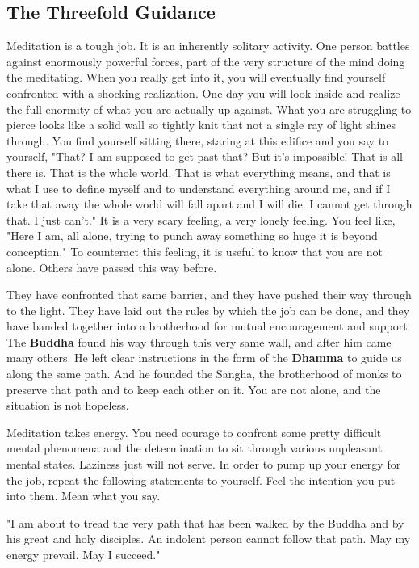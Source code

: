 \subsection*{The Threefold Guidance }
Meditation is a tough job. It is an inherently solitary
activity. One person battles against enormously powerful forces, part of the
very structure of the mind doing the meditating. When you really get into it,
you will eventually find yourself confronted with a shocking realization. One
day you will look inside and realize the full enormity of what you are actually
up against. What you are struggling to pierce looks like a solid wall so tightly
knit that not a single ray of light shines through. You find yourself sitting
there, staring at this edifice and you say to yourself, "That? I am supposed to
get past that? But it's impossible! That is all there is. That is the whole
world. That is what everything means, and that is what I use to define myself
and to understand everything around me, and if I take that away the whole world
will fall apart and I will die. I cannot get through that. I just can't." It is
a very scary feeling, a very lonely feeling. You feel like, "Here I am, all
alone, trying to punch away something so huge it is beyond conception." To
counteract this feeling, it is useful to know that you are not alone. Others
have passed this way before.

They have confronted that same barrier, and they have pushed their way through
to the light. They have laid out the rules by which the job can be done, and
they have banded together into a brotherhood for mutual encouragement and
support. The \textbf{Buddha} found his way through this very same wall, and after him
came many others. He left clear instructions in the form of the \textbf{Dhamma} to guide
us along the same path. And he founded the Sangha, the brotherhood of monks to
preserve that path and to keep each other on it. You are not alone, and the
situation is not hopeless.

Meditation takes energy. You need courage to confront some pretty difficult
mental phenomena and the determination to sit through various unpleasant mental
states. Laziness just will not serve. In order to pump up your energy for the
job, repeat the following statements to yourself. Feel the intention you put
into them. Mean what you say.

"I am about to tread the very path that has been walked by the Buddha and by his
great and holy disciples. An indolent person cannot follow that path. May my
energy prevail. May I succeed." 

